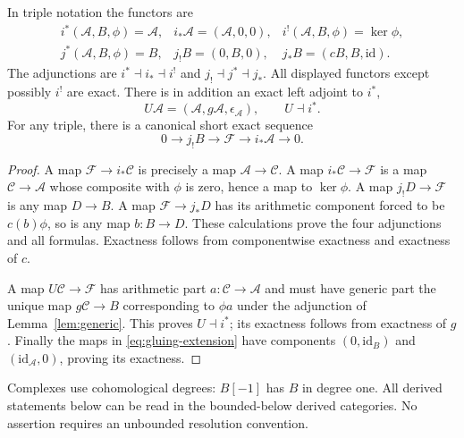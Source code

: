 \begin{theorem}\label{thm:recollement}
In triple notation the functors are
\[
\begin{array}{lll}
 i^*(\mathcal A,B,\phi)=\mathcal A,&
 i_*\mathcal A=(\mathcal A,0,0),&
 i^!(\mathcal A,B,\phi)=\ker\phi,\\[2pt]
 j^*(\mathcal A,B,\phi)=B,&
 j_!B=(0,B,0),&
 j_*B=(cB,B,\mathrm{id}).
\end{array}
 \tag{RP4}\label{eq:six-functors}
\]
The adjunctions are $i^*\dashv i_*\dashv i^!$ and
$j_!\dashv j^*\dashv j_*$. All displayed functors except possibly
$i^!$ are exact. There is in addition an exact left adjoint to $i^*$,
\[
 U\mathcal A=(\mathcal A,g\mathcal A,\epsilon_{\mathcal A}),
 \qquad U\dashv i^*.
 \tag{RP5}\label{eq:universal-coupling}
\]
For any triple, there is a canonical short exact sequence
\[
 0\longrightarrow j_!B\longrightarrow\mathcal F
 \longrightarrow i_*\mathcal A\longrightarrow0.
 \tag{RP6}\label{eq:gluing-extension}
\]
\end{theorem}
\begin{proof}
A map $\mathcal F\to i_*\mathcal C$ is precisely a map
$\mathcal A\to\mathcal C$. A map $i_*\mathcal C\to\mathcal F$
is a map $\mathcal C\to\mathcal A$ whose composite with $\phi$ is zero,
hence a map to $\ker\phi$. A map $j_!D\to\mathcal F$ is any map
$D\to B$. A map $\mathcal F\to j_*D$ has its arithmetic component
forced to be $c(b)\phi$, so is any map $b:B\to D$. These calculations
prove the four adjunctions and all formulas. Exactness follows from
componentwise exactness and exactness of $c$.

A map $U\mathcal C\to\mathcal F$ has arithmetic part
$a:\mathcal C\to\mathcal A$ and must have generic part the unique map
$g\mathcal C\to B$ corresponding to $\phi a$ under the adjunction
of Lemma~\ref{lem:generic}. This proves $U\dashv i^*$; its exactness
follows from exactness of $g$. Finally the maps in
\eqref{eq:gluing-extension} have components $(0,\mathrm{id}_B)$ and
$(\mathrm{id}_{\mathcal A},0)$, proving its exactness.
\end{proof}

Complexes use cohomological degrees: $B[-1]$ has $B$ in degree one.
All derived statements below can be read in the bounded-below derived
categories. No assertion requires an unbounded resolution convention.

